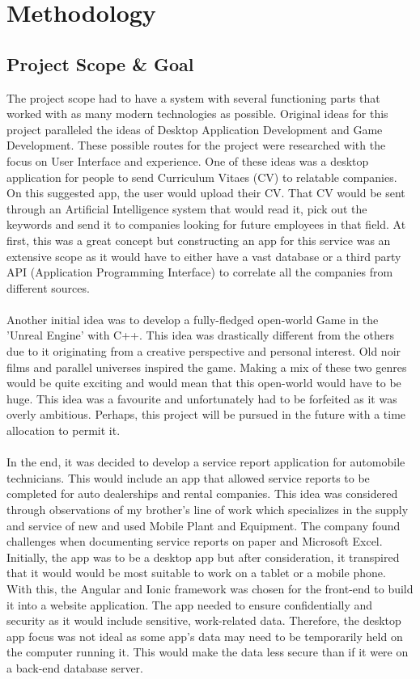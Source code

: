 \chapter{Methodology}
\section{Project Scope \& Goal}
The project scope had to have a system with several functioning parts that worked with as many modern technologies as possible. Original ideas for this project paralleled the ideas of Desktop Application Development and Game Development. These possible routes for the project were researched with the focus on User Interface and experience. One of these ideas was a desktop application for people to send Curriculum Vitaes (CV) to relatable companies. On this suggested app, the user would upload their CV. That CV would be sent through an Artificial Intelligence system that would read it, pick out the keywords and send it to companies looking for future employees in that field. At first, this was a great concept but constructing an app for this service was an extensive scope as it would have to either have a vast database or a third party API (Application Programming Interface) to correlate all the companies from different sources.
\\\\ Another initial idea was to develop a fully-fledged open-world Game in the 'Unreal Engine' with C++. This idea was drastically different from the others due to it originating from a creative perspective and personal interest. Old noir films and parallel universes inspired the game. Making a mix of these two genres would be quite exciting and would mean that this open-world would have to be huge. This idea was a favourite and unfortunately had to be forfeited as it was overly ambitious. Perhaps, this project will be pursued in the future with a time allocation to permit it. 
\\\\ In the end, it was decided to develop a service report application for automobile technicians. This would include an app that allowed service reports to be completed for auto dealerships and rental companies. This idea was considered through observations of my brother's line of work which specializes in the supply and service of new and used Mobile Plant and Equipment. The company found challenges when documenting service reports on paper and Microsoft Excel. Initially, the app was to be a desktop app but after consideration, it transpired that it would would be most suitable to work on a tablet or a mobile phone. With this, the Angular and Ionic framework was chosen for the front-end to build it into a website application. The app needed to ensure confidentially and security as it would include sensitive, work-related data. Therefore, the desktop app focus was not ideal as some app's data may need to be temporarily held on the computer running it. This would make the data less secure than if it were on a back-end database server. \cite{ref1}
